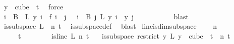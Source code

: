 \begin{isabellebody}
\ {\isacartoucheopen}y\ {\isasymin}\ cube\ {}\ t{\isacartoucheclose}\ \isamarkupfalse%
\ force\isanewline
\ \ \ \ \ \ \isamarkupfalse%
\isanewline
\isanewline
\ \ \ \ \ \ \isamarkupfalse%
\ \isamarkupfalse%
\ {\isachardoublequoteopen}{\isacharparenleft}{\kern0pt}{\isasymforall}i\ {\isasymin}\ B\ {}{\isachardot}{\kern0pt}\ {\isacharquery}{\kern0pt}L\ y\ i\ {\isacharequal}{\kern0pt}\ {\isacharquery}{\kern0pt}f\ i{\isacharparenright}{\kern0pt}\ {\isasymand}\ {\isacharparenleft}{\kern0pt}{\isasymforall}j\ {\isacharless}{\kern0pt}\ {}{\isachardot}{\kern0pt}\ {\isasymforall}i\ {\isasymin}\ B\ j{\isachardot}{\kern0pt}\ {\isacharparenleft}{\kern0pt}{\isacharquery}{\kern0pt}L\ y{\isacharparenright}{\kern0pt}\ i\ {\isacharequal}{\kern0pt}\ y\ j{\isacharparenright}{\kern0pt}{\isachardoublequoteclose}\ \isanewline
\ \ \ \ \ \ \ \ \isamarkupfalse%
\ blast\isanewline
\ \ \ \ \isamarkupfalse%
\isanewline
\ \ \isacommand{{\isacharbraceright}{\kern0pt}}\isamarkupfalse%
\isanewline
\ \ \isamarkupfalse%
\ \isamarkupfalse%
\ {\isachardoublequoteopen}is{\isacharunderscore}{\kern0pt}subspace\ {\isacharquery}{\kern0pt}L\ {}\ n\ t{\isachardoublequoteclose}\ \isamarkupfalse%
\ is{\isacharunderscore}{\kern0pt}subspace{\isacharunderscore}{\kern0pt}def\ \isamarkupfalse%
\ blast\isanewline
{}\isamarkupfalse%
%
\endisatagproof
{\isafoldproof}%
%
\isadelimproof
\isanewline
%
\endisadelimproof
\isanewline
{}\isamarkupfalse%
\ line{\isacharunderscore}{\kern0pt}is{\isacharunderscore}{\kern0pt}dim{}{\isacharunderscore}{\kern0pt}subspace{\isacharcolon}{\kern0pt}\ \isanewline
\ \ \ {\isachardoublequoteopen}n\ {\isachargreater}{\kern0pt}\ {}{\isachardoublequoteclose}\ \isanewline
\ \ \ \ \ {\isachardoublequoteopen}t\ {\isachargreater}{\kern0pt}\ {}{\isachardoublequoteclose}\ \isanewline
\ \ \ \ \ {\isachardoublequoteopen}is{\isacharunderscore}{\kern0pt}line\ L\ n\ t{\isachardoublequoteclose}\isanewline
\ \ \ {\isachardoublequoteopen}is{\isacharunderscore}{\kern0pt}subspace\ {\isacharparenleft}{\kern0pt}restrict\ {\isacharparenleft}{\kern0pt}{\isasymlambda}y{\isachardot}{\kern0pt}\ L\ {\isacharparenleft}{\kern0pt}y\ {}{\isacharparenright}{\kern0pt}{\isacharparenright}{\kern0pt}\ {\isacharparenleft}{\kern0pt}cube\ {}\ t{\isacharparenright}{\kern0pt}{\isacharparenright}{\kern0pt}\ {}\ n\ t{\isachardoublequoteclose}\isanewline

\end{isabellebody}
